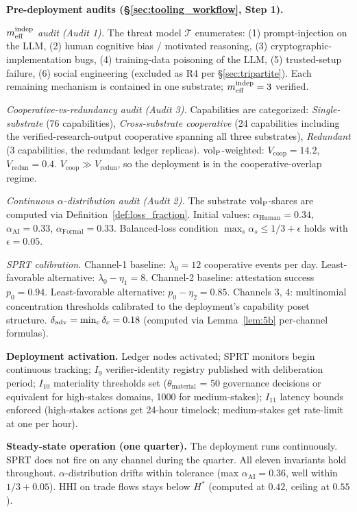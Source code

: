 \textbf{Pre-deployment audits (\S\ref{sec:tooling_workflow}, Step 1).}

\emph{$m_{\mathrm{eff}}^{\mathrm{indep}}$ audit (Audit 1).}  The threat model $\mathcal{T}$ enumerates:
(1) prompt-injection on the LLM, (2) human cognitive bias / motivated
reasoning, (3) cryptographic-implementation bugs, (4) training-data poisoning
of the LLM, (5) trusted-setup failure, (6) social engineering (excluded as R4
per \S\ref{sec:tripartite}). Each remaining mechanism is contained in one
substrate; $m_{\mathrm{eff}}^{\mathrm{indep}} = 3$ verified.

\emph{Cooperative-vs-redundancy audit (Audit 3).}  Capabilities are
categorized: \emph{Single-substrate} (76 capabilities), \emph{Cross-substrate
cooperative} (24 capabilities including the verified-research-output
cooperative spanning all three substrates), \emph{Redundant} (3 capabilities,
the redundant ledger replicas). ${\operatorname{vol}_{\mathrm{P}}}$-weighted: $V_{\mathrm{coop}} = 14.2$,
$V_{\mathrm{redun}} = 0.4$. $V_{\mathrm{coop}} \gg V_{\mathrm{redun}}$, so the
deployment is in the cooperative-overlap regime.

\emph{Continuous $\alpha$-distribution audit (Audit 2).}  The
substrate ${\operatorname{vol}_{\mathrm{P}}}$-shares are computed via Definition~\ref{def:loss_fraction}.
Initial values: $\alpha_{\mathrm{Human}} = 0.34$, $\alpha_{\mathrm{AI}}
= 0.33$, $\alpha_{\mathrm{Formal}} = 0.33$. Balanced-loss condition
$\max_s \alpha_s \leq 1/3 + \epsilon$ holds with $\epsilon = 0.05$.

\emph{SPRT calibration.}  Channel-1 baseline: $\lambda_0 = 12$
cooperative events per day. Least-favorable alternative:
$\lambda_0 - \eta_1 = 8$. Channel-2 baseline: attestation success
$p_0 = 0.94$. Least-favorable alternative: $p_0 - \eta_2 = 0.85$.
Channels 3, 4: multinomial concentration thresholds calibrated to
the deployment's capability poset structure. $\delta_{\mathrm{adv}} = \min_c
\delta_c = 0.18$ (computed via Lemma~\ref{lem:5b} per-channel
formulas).

\textbf{Deployment activation.}
Ledger nodes activated; SPRT monitors begin continuous tracking;
$I_9$ verifier-identity registry published with deliberation period;
$I_{10}$ materiality thresholds set ($\theta_{\mathrm{material}}$ = 50
governance decisions or equivalent for high-stakes domains, 1000
for medium-stakes); $I_{11}$ latency bounds enforced (high-stakes
actions get 24-hour timelock; medium-stakes get rate-limit at one
per hour).

\textbf{Steady-state operation (one quarter).}
The deployment runs continuously. SPRT does not fire on any
channel during the quarter. All eleven invariants hold throughout.
$\alpha$-distribution drifts within tolerance (max
$\alpha_{\mathrm{AI}} = 0.36$, well within $1/3 + 0.05$). HHI on
trade flows stays below $H^*$ (computed at $0.42$, ceiling at
$0.55$).

